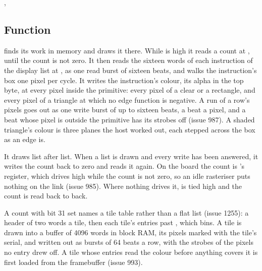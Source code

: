 
%
{, }

\subsection*{Function}

 finds its work in memory and draws it there. While
 is high it reads a count at , until the count
is not zero. It then reads the sixteen words of each instruction of
the display list at , as one read burst of sixteen beats, and
walks the instruction's box one pixel per cycle. It writes the
instruction's colour, its alpha in the top byte, at every pixel inside
the primitive: every pixel of a clear or a rectangle, and every pixel
of a triangle at which no edge function is negative. A run of a row's
pixels goes out as one write burst of up to sixteen beats, a beat a
pixel, and a beat whose pixel is outside the primitive has its strobes
off (issue 987). A shaded
triangle's colour is three planes the host worked out, each stepped
across the box as an edge is.

It draws list after list. When a list is drawn and every write has
been answered, it writes the count back to zero and reads it again.
On the board the count is 's register, which drives
 high while the count is not zero, so an idle rasteriser
puts nothing on the link (issue 985). Where nothing drives it,
 is tied high and the count is read back to back.

A count with bit 31 set names a tile table rather than a flat list
(issue 1255): a header of two words a tile, then each tile's entries
past , which  bins. A tile is drawn
into a buffer of 4096 words in block RAM, its pixels marked with the
tile's serial, and written out as bursts of 64 beats a row, with the
strobes of the pixels no entry drew off. A tile whose entries read the
colour before anything covers it is first loaded from the framebuffer
(issue 993).

